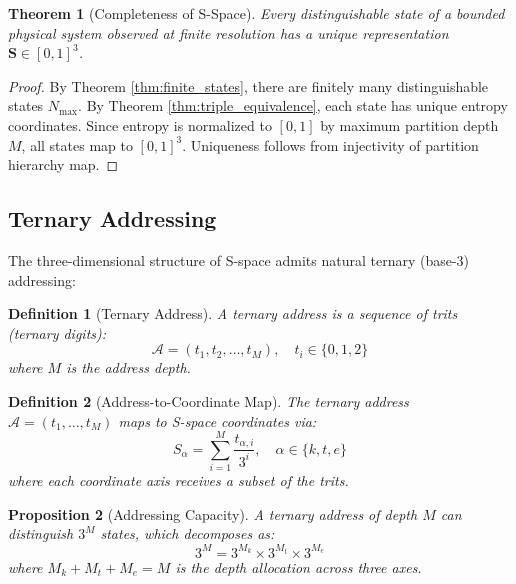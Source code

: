 \documentclass[twocolumn,10pt]{article}
\newtheorem{theorem}{Theorem}
\newtheorem{proposition}[theorem]{Proposition}
\newtheorem{definition}{Definition}
\begin{document}
\begin{theorem}[Completeness of S-Space]
\label{thm:s_space_complete}
Every distinguishable state of a bounded physical system observed at finite resolution has a unique representation $\mathbf{S} \in [0,1]^3$.
\end{theorem}

\begin{proof}
By Theorem \ref{thm:finite_states}, there are finitely many distinguishable states $N_{\text{max}}$. By Theorem \ref{thm:triple_equivalence}, each state has unique entropy coordinates. Since entropy is normalized to $[0,1]$ by maximum partition depth $M$, all states map to $[0,1]^3$. Uniqueness follows from injectivity of partition hierarchy map.
\end{proof}

\subsection{Ternary Addressing}

The three-dimensional structure of S-space admits natural ternary (base-3) addressing:

\begin{definition}[Ternary Address]
A ternary address is a sequence of trits (ternary digits):
\begin{equation}
\mathcal{A} = (t_1, t_2, \ldots, t_M), \quad t_i \in \{0, 1, 2\}
\end{equation}
where $M$ is the address depth.
\end{definition}

\begin{definition}[Address-to-Coordinate Map]
The ternary address $\mathcal{A} = (t_1, \ldots, t_M)$ maps to S-space coordinates via:
\begin{equation}
S_\alpha = \sum_{i=1}^{M} \frac{t_{\alpha,i}}{3^i}, \quad \alpha \in \{k, t, e\}
\end{equation}
where each coordinate axis receives a subset of the trits.
\end{definition}

\begin{proposition}[Addressing Capacity]
A ternary address of depth $M$ can distinguish $3^M$ states, which decomposes as:
\begin{equation}
3^M = 3^{M_k} \times 3^{M_t} \times 3^{M_e}
\end{equation}
where $M_k + M_t + M_e = M$ is the depth allocation across three axes.
\end{proposition}
\end{document}
